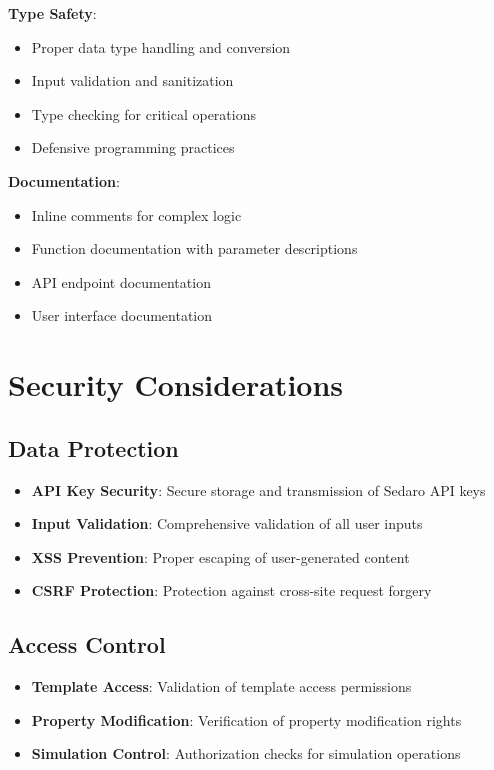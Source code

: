 \documentclass[12pt,a4paper]{article}
\begin{document}
\textbf{Type Safety}:
\begin{itemize}
    \item Proper data type handling and conversion
    \item Input validation and sanitization
    \item Type checking for critical operations
    \item Defensive programming practices
\end{itemize}

\textbf{Documentation}:
\begin{itemize}
    \item Inline comments for complex logic
    \item Function documentation with parameter descriptions
    \item API endpoint documentation
    \item User interface documentation
\end{itemize}

\section{Security Considerations}

\subsection{Data Protection}

\begin{itemize}
    \item \textbf{API Key Security}: Secure storage and transmission of Sedaro API keys
    \item \textbf{Input Validation}: Comprehensive validation of all user inputs
    \item \textbf{XSS Prevention}: Proper escaping of user-generated content
    \item \textbf{CSRF Protection}: Protection against cross-site request forgery
\end{itemize}

\subsection{Access Control}

\begin{itemize}
    \item \textbf{Template Access}: Validation of template access permissions
    \item \textbf{Property Modification}: Verification of property modification rights
    \item \textbf{Simulation Control}: Authorization checks for simulation operations
\end{itemize}
\end{document}
